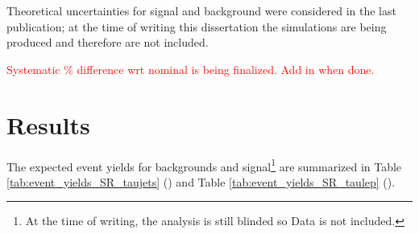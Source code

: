 		Theoretical uncertainties for signal and \ttbar background were considered in the last publication; at the time of writing this dissertation the simulations are being produced and therefore are not included. 

		\textcolor{red}{Systematic \% difference wrt nominal is being finalized. Add in when done.}

	\section{Results}\label{sec:results}
		The expected event yields for backgrounds and signal\footnote{At the time of writing, the analysis is still blinded so Data is not included.} are summarized in Table \ref{tab:event_yields_SR_taujets} (\taujets) and Table \ref{tab:event_yields_SR_taulep} (\taulep).

